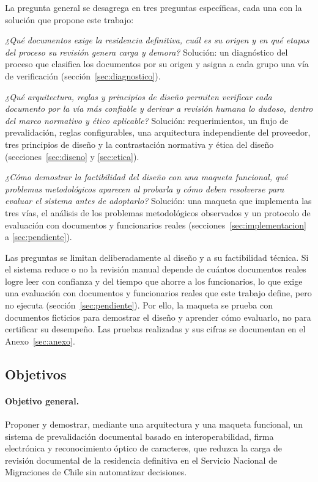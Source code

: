 \documentclass[11pt,a4paper]{article}
\begin{document}
La pregunta general se desagrega en tres preguntas específicas, cada una con la solución que propone este trabajo:
\begin{description}[leftmargin=1.2cm,style=nextline]
  \item[PE1.] \emph{¿Qué documentos exige la residencia definitiva, cuál es su origen y en qué etapas del proceso su revisión genera carga y demora?} Solución: un diagnóstico del proceso que clasifica los documentos por su origen y asigna a cada grupo una vía de verificación (sección~\ref{sec:diagnostico}).
  \item[PE2.] \emph{¿Qué arquitectura, reglas y principios de diseño permiten verificar cada documento por la vía más confiable y derivar a revisión humana lo dudoso, dentro del marco normativo y ético aplicable?} Solución: requerimientos, un flujo de prevalidación, reglas configurables, una arquitectura independiente del proveedor, tres principios de diseño y la contrastación normativa y ética del diseño (secciones~\ref{sec:diseno} y \ref{sec:etica}).
  \item[PE3.] \emph{¿Cómo demostrar la factibilidad del diseño con una maqueta funcional, qué problemas metodológicos aparecen al probarla y cómo deben resolverse para evaluar el sistema antes de adoptarlo?} Solución: una maqueta que implementa las tres vías, el análisis de los problemas metodológicos observados y un protocolo de evaluación con documentos y funcionarios reales (secciones~\ref{sec:implementacion} a \ref{sec:pendiente}).
\end{description}

Las preguntas se limitan deliberadamente al diseño y a su factibilidad técnica. Si el sistema reduce o no la revisión manual depende de cuántos documentos reales logre leer con confianza y del tiempo que ahorre a los funcionarios, lo que exige una evaluación con documentos y funcionarios reales que este trabajo define, pero no ejecuta (sección~\ref{sec:pendiente}). Por ello, la maqueta se prueba con documentos ficticios para demostrar el diseño y aprender cómo evaluarlo, no para certificar su desempeño. Las pruebas realizadas y sus cifras se documentan en el Anexo~\ref{sec:anexo}.

\subsection{Objetivos}
\paragraph{Objetivo general.} Proponer y demostrar, mediante una arquitectura y una maqueta funcional, un sistema de prevalidación documental basado en interoperabilidad, firma electrónica y reconocimiento óptico de caracteres, que reduzca la carga de revisión documental de la residencia definitiva en el Servicio Nacional de Migraciones de Chile sin automatizar decisiones.
\end{document}
